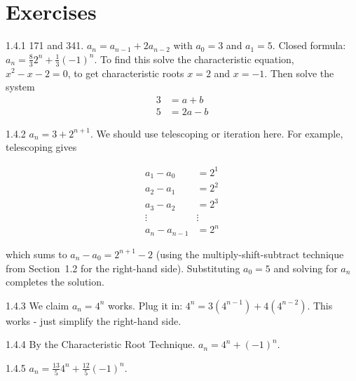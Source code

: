 \documentclass[11pt,]{book}
\theoremstyle{ptxplainnotitle}
\theoremstyle{ptxplaintitle}
\theoremstyle{ptxdefinitionnotitle}
\theoremstyle{ptxdefinitiontitle}
\theoremstyle{ptxdefinitionnotitle}
\theoremstyle{ptxdefinitiontitle}
\theoremstyle{ptxdefinitionnotitle}
\theoremstyle{ptxdefinitiontitle}
\theoremstyle{ptxdefinitiontitlenonumber}
\theoremstyle{ptxdefinitiontitlenonumber}
\numberwithin{equation}{chapter}
\newcommand{\amp}{&}
\begin{document}
\section*{Exercises}
\begin{divisionexercise}{1.4.1}
\textbf{}\hypertarget{p-473}{}%
171 and 341. \(a_n = a_{n-1} + 2a_{n-2}\) with \(a_0 = 3\) and \(a_1 = 5\). Closed formula: \(a_n = \frac{8}{3}2^n + \frac{1}{3}(-1)^n\).  To find this solve the characteristic equation, \(x^2 - x - 2 = 0\), to get characteristic roots \(x = 2\) and \(x=-1\).  Then solve the system%
\begin{align*}
3 \amp = a + b\\
5 \amp = 2a - b
\end{align*}
%
\end{divisionexercise}%
\begin{divisionexercise}{1.4.2}
\textbf{}\hypertarget{p-479}{}%
\(a_n = 3 + 2^{n+1}\text{.}\)  We should use telescoping or iteration here.  For example, telescoping gives%
\par
\hypertarget{p-480}{}%
%
\begin{equation*}
\begin{aligned}
a_1 - a_0 \amp = 2^1\\
a_2 - a_1 \amp = 2^2\\
a_3 - a_2 \amp = 2^3\\
\vdots\amp \vdots \\
a_n - a_{n-1} \amp = 2^n
\end{aligned}
\end{equation*}
%
\par
\hypertarget{p-481}{}%
which sums to \(a_n - a_0 = 2^{n+1} - 2\) (using the multiply-shift-subtract technique from Section~1.2 for the right-hand side).  Substituting \(a_0 = 5\) and solving for \(a_n\) completes the solution.%
\end{divisionexercise}%
\begin{divisionexercise}{1.4.3}
\textbf{}\hypertarget{p-483}{}%
We claim \(a_n = 4^n\) works. Plug it in: \(4^n = 3(4^{n-1}) + 4(4^{n-2})\). This works - just simplify the right-hand side.%
\end{divisionexercise}%
\begin{divisionexercise}{1.4.4}
\textbf{}\hypertarget{p-487}{}%
By the Characteristic Root Technique. \(a_n = 4^n + (-1)^n\text{.}\)%
\end{divisionexercise}%
\begin{divisionexercise}{1.4.5}
\textbf{}\hypertarget{p-491}{}%
\(a_n = \frac{13}{5} 4^n + \frac{12}{5} (-1)^n\text{.}\)%
\end{divisionexercise}%
\end{document}
